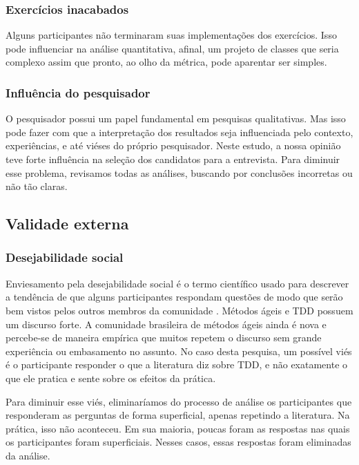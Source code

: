 \documentclass[conference]{IEEEtran}
\begin{document}
\subsubsection{Exercícios inacabados}

Alguns participantes não terminaram suas implementações dos exercícios. Isso
pode influenciar na análise quantitativa, afinal, um projeto de classes que
seria complexo assim que pronto, ao olho da métrica, pode aparentar ser simples.

\subsubsection{Influência do pesquisador}

O pesquisador possui
um papel fundamental em pesquisas qualitativas. Mas isso pode fazer com que
a interpretação dos resultados seja influenciada pelo contexto, experiências,
e até viéses do próprio pesquisador.
Neste estudo, a nossa opinião teve forte influência na seleção dos candidatos
para a entrevista.
Para diminuir esse problema, revisamos todas as análises,
buscando por conclusões incorretas ou não tão claras. 

\subsection{Validade externa}

\subsubsection{Desejabilidade social}

Enviesamento pela desejabilidade social é o termo científico usado para descrever
a tendência de que alguns participantes respondam questões de modo que serão
bem vistos pelos outros membros da comunidade \cite{crowne}.
Métodos ágeis e TDD possuem um discurso forte. A comunidade brasileira de métodos
ágeis ainda é nova e percebe-se de maneira empírica que muitos repetem o discurso
sem grande experiência ou embasamento no assunto.
No caso desta pesquisa, um possível viés é o participante responder o que
a literatura diz sobre TDD, e não exatamente o que ele pratica e sente sobre
os efeitos da prática. 

Para diminuir esse viés, eliminaríamos do processo de análise os participantes
que responderam as perguntas de forma superficial, apenas repetindo a literatura. Na prática,
isso não aconteceu. Em sua maioria, poucas foram as respostas nas quais os participantes
foram superficiais. Nesses casos, essas respostas foram eliminadas da análise.
\end{document}
